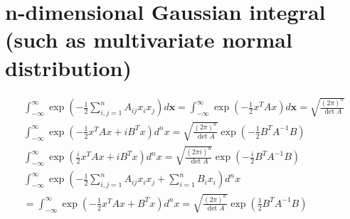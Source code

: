 \section*{n-dimensional Gaussian integral (such as multivariate normal distribution)}
\begin{center}
    \begin{equation*}
        \begin{gathered}
        \int_{-\infty}^{\infty} \exp \left(-\frac{1}{2} \sum_{i, j=1}^{n} A_{i j} x_{i} x_{j}\right) d \mathbf{x}=\int_{-\infty}^{\infty} \exp \left(-\frac{1}{2} x^{T} A x\right) d \mathbf{x}=\sqrt{\frac{(2 \pi)^{n}}{\operatorname{det} A}} \\
        \int_{-\infty}^{\infty} \exp \left(-\frac{1}{2} x^{T} A x+i B^{T} x\right) d^{n} x=\sqrt{\frac{(2 \pi)^{n}}{\operatorname{det} A}} \exp \left(-\frac{1}{2} B^{T} A^{-1} B\right) \\
        \int_{-\infty}^{\infty} \exp \left(\frac{i}{2} x^{T} A x+i B^{T} x\right) d^{n} x=\sqrt{\frac{(2 \pi i)^{n}}{\operatorname{det} A}} \exp \left(-\frac{i}{2} B^{T} A^{-1} B\right) \\
        \int_{-\infty}^{\infty} \exp \left(-\frac{1}{2} \sum_{i, j=1}^{n} A_{i j} x_{i} x_{j}+\sum_{i=1}^{n} B_{i} x_{i}\right) d^{n}x\\
        =\int_{-\infty}^{\infty} \exp \left(-\frac{1}{2} x^{T} A x+B^{T} x\right) d^{n} x=\sqrt{\frac{(2 \pi)^{n}}{\operatorname{det} A}} \exp \left(\frac{1}{2} B^{T} A^{-1} B\right) \\
        \end{gathered}
    \end{equation*}
\end{center}

